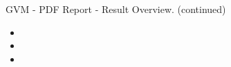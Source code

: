 \begin{frame}[t]{GVM - PDF Report - Result Overview. (continued)}
  \begin{itemize}
    \setlength{\itemsep}{0.12cm}
      \item {}
      \item {}
      \item {}
  \end{itemize}
\end{frame}
